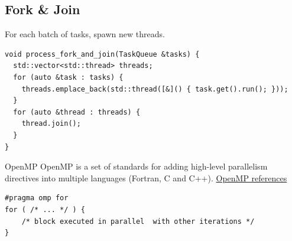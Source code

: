\subsection{Fork \& Join}
For each batch of tasks, spawn new threads.
\begin{verbatim}
void process_fork_and_join(TaskQueue &tasks) {
  std::vector<std::thread> threads;
  for (auto &task : tasks) {
    threads.emplace_back(std::thread([&]() { task.get().run(); }));
  }
  for (auto &thread : threads) {
    thread.join();
  }
}
\end{verbatim}
\begin{sidenotebox}{OpenMP}
    OpenMP is a set of standards for adding high-level parallelism directives into multiple languages (Fortran, C and C++).
    \href{https://www.openmp.org/wp-content/uploads/OpenMPRefCard-5-2-web.pdf}{OpenMP references}
    \begin{verbatim}
#pragma omp for
for ( /* ... */ ) { 
    /* block executed in parallel  with other iterations */ 
}
    \end{verbatim}
\end{sidenotebox}

